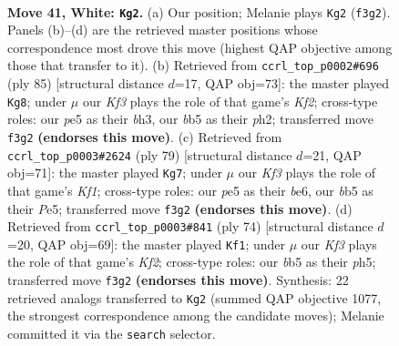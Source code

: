 \documentclass[11pt]{article}
\begin{document}
\clearpage

\begin{figure}[p]\centering
\begin{subfigure}{0.46\textwidth}\centering
\resizebox{\linewidth}{!}{%
\newchessgame
\chessboard[
  setfen={5r2/4k3/8/pb2p3/4N3/1P3KP1/8/R7 w - - 2 41},
  showmover=false,
  pgfstyle=straightmove, color=movearrow, markmove={f3-g2}
]}
\caption{}
\end{subfigure}\hfill
\begin{subfigure}{0.46\textwidth}\centering
\resizebox{\linewidth}{!}{%
\newchessgame
\chessboard[
  setfen={8/R4k2/5np1/7p/8/6PB/5K1P/1r6 b - - 1 43},
  showmover=false,
  pgfstyle=straightmove, color=movearrow, markmove={f7-g8}
]}
\caption{}
\end{subfigure}
\\[4pt]
\begin{subfigure}{0.46\textwidth}\centering
\resizebox{\linewidth}{!}{%
\newchessgame
\chessboard[
  setfen={R4k2/4n3/4B1p1/4p1Pp/4r3/6P1/8/6K1 b - - 1 40},
  showmover=false,
  pgfstyle=straightmove, color=movearrow, markmove={f8-g7}
]}
\caption{}
\end{subfigure}\hfill
\begin{subfigure}{0.46\textwidth}\centering
\resizebox{\linewidth}{!}{%
\newchessgame
\chessboard[
  setfen={8/5p2/7R/4k2p/5p2/7P/r4KP1/8 w - - 2 38},
  showmover=false,
  pgfstyle=straightmove, color=movearrow, markmove={f2-f1}
]}
\caption{}
\end{subfigure}
\caption{\textbf{Move 41, White: \texttt{Kg2}.} (a) Our position; Melanie plays \texttt{Kg2} (\texttt{f3g2}). Panels (b)--(d) are the retrieved master positions whose correspondence most drove this move (highest QAP objective among those that transfer to it). (b) Retrieved from \texttt{ccrl\_top\_p0002\#696} (ply 85) [structural distance $d$=17, QAP obj=73]: the master played \texttt{Kg8}; under $\mu$ our \emph{Kf3} plays the role of that game's \emph{Kf2}; cross-type roles: our \emph{p}e5 as their \emph{b}h3, our \emph{b}b5 as their \emph{p}h2; transferred move \texttt{f3g2} \textbf{(endorses this move)}. (c) Retrieved from \texttt{ccrl\_top\_p0003\#2624} (ply 79) [structural distance $d$=21, QAP obj=71]: the master played \texttt{Kg7}; under $\mu$ our \emph{Kf3} plays the role of that game's \emph{Kf1}; cross-type roles: our \emph{p}e5 as their \emph{b}e6, our \emph{b}b5 as their \emph{P}e5; transferred move \texttt{f3g2} \textbf{(endorses this move)}. (d) Retrieved from \texttt{ccrl\_top\_p0003\#841} (ply 74) [structural distance $d$=20, QAP obj=69]: the master played \texttt{Kf1}; under $\mu$ our \emph{Kf3} plays the role of that game's \emph{Kf2}; cross-type roles: our \emph{b}b5 as their \emph{p}h5; transferred move \texttt{f3g2} \textbf{(endorses this move)}. Synthesis: 22 retrieved analogs transferred to \texttt{Kg2} (summed QAP objective 1077, the strongest correspondence among the candidate moves); Melanie committed it via the \texttt{search} selector.}
\label{fig:thought-m80}
\end{figure}
\end{document}

